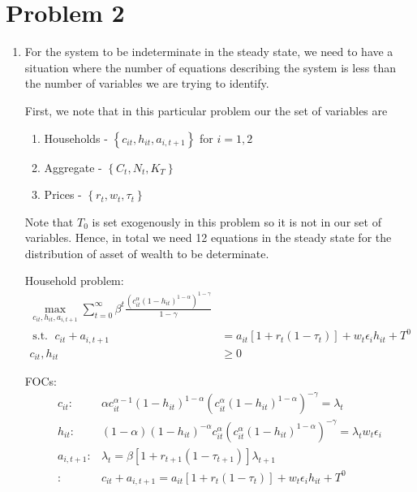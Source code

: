 \documentclass[12pt]{article}
\newcommand{\1}{{\bf 1}} %
\DeclareMathOperator{\subjectto}{{s.t.\ }} %
\newcommand{\cbra}[1]{\left\{ #1 \right\}}
\begin{document}
\section*{Problem 2}
\begin{enumerate}[(1)]
	\item
	For the system to be indeterminate in the steady state, we need to have a situation where the number of equations describing the system is less than the number of variables we are trying to identify.
	
	First, we note that in this particular problem our the set of variables are 
	\begin{enumerate}
		\item Households - $\cbra{c_{it}, h_{it},a_{i,t+1}}$ for $i=1,2$
		\item Aggregate - $\cbra{C_t,N_t,K_T}$
		\item Prices - $\cbra{r_t,w_t,\tau_t}$
	\end{enumerate}
	Note that $T_0$ is set exogenously in this problem so it is not in our set of variables. Hence, in total we need 12 equations in the steady state for the distribution of asset of wealth to be determinate.
	
	
	
	Household problem:
			\begin{align*}
	\max_{c_{it},h_{it},a_{i,t+1}} \sum_{t=0}^{\infty}\beta^t \frac{\left( c_{it}^\alpha(1-h_{it})^{1-\alpha}\right) ^{1-\gamma}}{1-\gamma} \\
	\subjectto c_{it}+a_{i,t+1} & = a_{it}[1+r_t(1-\tau_t)]+ w_t\epsilon_i h_{it} + T^0  \\
	c_{it},h_{it}	& \geq 0
	\end{align*}
	
	FOCs:
	\begin{align*}	
	c_{it}: & \alpha c_{it}^{\alpha-1}(1-h_{it})^{1-\alpha} \left( c_{it}^\alpha(1-h_{it})^{1-\alpha}\right) ^{-\gamma} =  \lambda_t \\
	h_{it}: & (1-\alpha) (1-h_{it})^{-\alpha}  c_{it}^\alpha \left( c_{it}^\alpha(1-h_{it})^{1-\alpha}\right) ^{-\gamma} =  \lambda_t w_t \epsilon_i \\
	a_{i,t+1}: & \lambda_t = \beta [1+r_{t+1}(1-\tau_{t+1})]\lambda_{t+1}\\
	: &c_{it}+a_{i,t+1}  = a_{it}[1+r_t(1-\tau_t)]+ w_t\epsilon_ih_{it} + T^0  \\
	\end{align*}
	

\end{enumerate}
\end{document}
